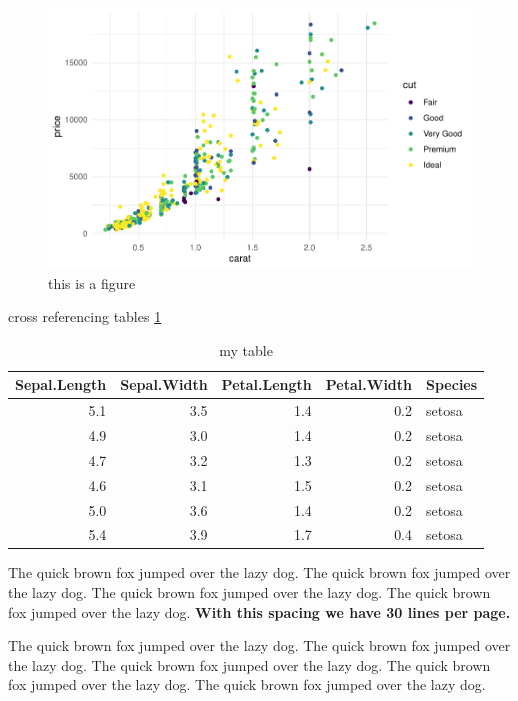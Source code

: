 \documentclass[journal=,manuscript=]{achemso}
\theoremstyle{definition}
\theoremstyle{definition}
\theoremstyle{definition}
\theoremstyle{remark}
\begin{document}
\begin{figure}

{\centering \includegraphics{acs_article_files/figure-latex/diamond-plot-1} 

}

\caption{this is a figure}\label{fig:diamond-plot}
\end{figure}

cross referencing tables \ref{tab:iris}

\begin{table}

\caption{\label{tab:iris}my table}
\centering
\begin{tabular}[t]{r|r|r|r|l}
\hline
Sepal.Length & Sepal.Width & Petal.Length & Petal.Width & Species\\
\hline
5.1 & 3.5 & 1.4 & 0.2 & setosa\\
\hline
4.9 & 3.0 & 1.4 & 0.2 & setosa\\
\hline
4.7 & 3.2 & 1.3 & 0.2 & setosa\\
\hline
4.6 & 3.1 & 1.5 & 0.2 & setosa\\
\hline
5.0 & 3.6 & 1.4 & 0.2 & setosa\\
\hline
5.4 & 3.9 & 1.7 & 0.4 & setosa\\
\hline
\end{tabular}
\end{table}

The quick brown fox jumped over the lazy dog.
The quick brown fox jumped over the lazy dog.
The quick brown fox jumped over the lazy dog.
The quick brown fox jumped over the lazy dog.
\textbf{With this spacing we have 30 lines per page.}

The quick brown fox jumped over the lazy dog.
The quick brown fox jumped over the lazy dog.
The quick brown fox jumped over the lazy dog.
The quick brown fox jumped over the lazy dog.
The quick brown fox jumped over the lazy dog.
\end{document}
